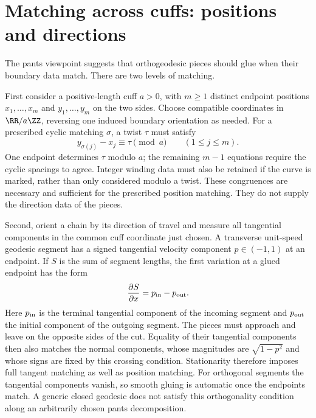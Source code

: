 \section{Matching across cuffs: positions and directions}
\label{sec:matching}

The pants viewpoint suggests that orthogeodesic pieces should glue when
their boundary data match. There are two levels of matching.

First consider a positive-length cuff $a>0$, with $m\geq1$ distinct
endpoint positions $x_1,\ldots,x_m$ and $y_1,\ldots,y_m$ on the two sides.
Choose compatible
coordinates in $\RR/a\ZZ$, reversing one induced boundary orientation
as needed. For a prescribed cyclic matching $\sigma$, a twist $\tau$
must satisfy
\begin{equation}
 y_{\sigma(j)}-x_j\equiv\tau\pmod a
       \qquad(1\le j\le m).
 \label{eq:endpointmatch}
\end{equation}
One endpoint determines $\tau$ modulo $a$; the remaining $m-1$ equations
require the cyclic spacings to agree. Integer winding data must also be
retained if the curve is marked, rather than only considered modulo a
twist. These congruences are necessary and sufficient for the prescribed
position matching. They do not supply the direction data of the pieces.

Second, orient a chain by its direction of travel and measure all
tangential components in the common cuff coordinate just chosen.
A transverse unit-speed geodesic segment has a signed tangential velocity
component $p\in(-1,1)$ at an endpoint. If $S$ is the sum of segment lengths, the first
variation at a glued endpoint has the form
\begin{equation}
 \frac{\partial S}{\partial x}=p_{\rm in}-p_{\rm out}.
 \label{eq:momentummatch}
\end{equation}
Here $p_{\rm in}$ is the terminal tangential component of the incoming
segment and $p_{\rm out}$ the initial component of the outgoing segment.
The pieces must approach and leave on the opposite sides of the cut.
Equality of their tangential components then also matches the normal
components, whose magnitudes are $\sqrt{1-p^2}$ and whose signs are fixed
by this crossing condition. Stationarity therefore imposes full tangent
matching as well as position matching. For
orthogonal segments the tangential components vanish, so smooth gluing
is automatic once the endpoints match. A generic closed geodesic does
not satisfy this orthogonality condition along an arbitrarily chosen
pants decomposition.

